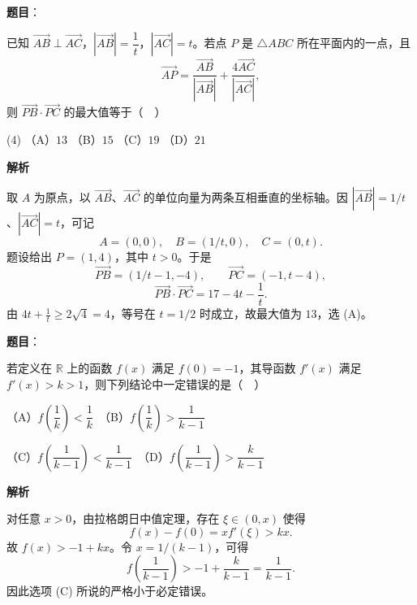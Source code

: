\begin{answer}

\textbf{题目}：

已知 $\overrightarrow{AB}\perp\overrightarrow{AC}$，$|\overrightarrow{AB}|=\dfrac1t$，$|\overrightarrow{AC}|=t$。若点 $P$ 是 $\triangle ABC$ 所在平面内的一点，且
\nopagebreak[4]
\[
\overrightarrow{AP}=\frac{\overrightarrow{AB}}{|\overrightarrow{AB}|}+\frac{4\overrightarrow{AC}}{|\overrightarrow{AC}|},
\]
则 $\overrightarrow{PB}\cdot\overrightarrow{PC}$ 的最大值等于（　）

\begin{gkopts}(4)
\task （A）$13$
\task （B）$15$
\task （C）$19$
\task （D）$21$
\end{gkopts}

\textbf{解析}

取 $A$ 为原点，以 $\overrightarrow{AB}$、$\overrightarrow{AC}$ 的单位向量为两条互相垂直的坐标轴。因 $|\overrightarrow{AB}|=1/t$、$|\overrightarrow{AC}|=t$，可记
\nopagebreak[4]
\[
A=(0,0),\quad B=(1/t,0),\quad C=(0,t).
\]
题设给出 $P=(1,4)$，其中 $t>0$。于是
\nopagebreak[4]
\[
\overrightarrow{PB}=(1/t-1,-4),\qquad
\overrightarrow{PC}=(-1,t-4),
\]
\nopagebreak[4]
\[
\overrightarrow{PB}\cdot\overrightarrow{PC}
=17-4t-\frac1t.
\]
由 $4t+\frac1t\geqslant2\sqrt{4}=4$，等号在 $t=1/2$ 时成立，故最大值为 $13$，选 (A)。


\end{answer}
\begin{answer}

\textbf{题目}：

若定义在 $\mathbb{R}$ 上的函数 $f(x)$ 满足 $f(0)=-1$，其导函数 $f'(x)$ 满足 $f'(x)>k>1$，则下列结论中一定错误的是（　）

（A）$f\!\left(\dfrac1k\right)<\dfrac1k$　（B）$f\!\left(\dfrac1k\right)>\dfrac1{k-1}$

（C）$f\!\left(\dfrac1{k-1}\right)<\dfrac1{k-1}$　（D）$f\!\left(\dfrac1{k-1}\right)>\dfrac{k}{k-1}$

\textbf{解析}

对任意 $x>0$，由拉格朗日中值定理，存在 $\xi\in(0,x)$ 使得
\nopagebreak[4]
\[
f(x)-f(0)=xf'(\xi)>kx.
\]
故 $f(x)>-1+kx$。令 $x=1/(k-1)$，可得
\nopagebreak[4]
\[
f\!\left(\frac1{k-1}\right)>
-1+\frac{k}{k-1}=\frac1{k-1}.
\]
因此选项 (C) 所说的严格小于必定错误。


\end{answer}
